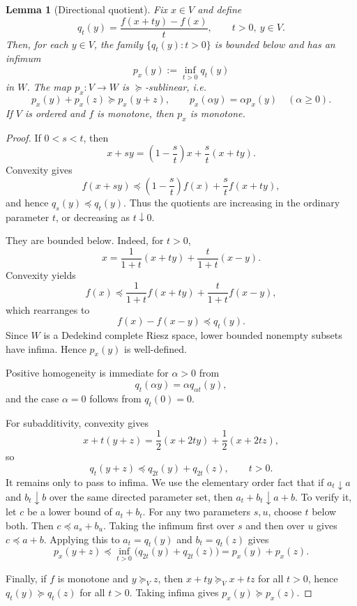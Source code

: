 \documentclass[11pt]{article}
\newtheorem{lemma}{Lemma}
\begin{document}
\begin{lemma}[Directional quotient]\label{lem:directional}
Fix $x\in V$ and define
\[
  q_t(y)=\frac{f(x+ty)-f(x)}{t},\qquad t>0,\ y\in V.
\]
Then, for each $y\in V$, the family $\{q_t(y):t>0\}$ is bounded below and has an
infimum
\[
  p_x(y):=\inf_{t>0}q_t(y)
\]
in $W$. The map $p_x:V\to W$ is $\succeq$-sublinear, i.e.
\[
  p_x(y)+p_x(z)\succeq p_x(y+z),\qquad
  p_x(\alpha y)=\alpha p_x(y)\quad(\alpha\geq0).
\]
If $V$ is ordered and $f$ is monotone, then $p_x$ is monotone.
\end{lemma}

\begin{proof}
If $0<s<t$, then
\[
  x+sy=\left(1-\frac{s}{t}\right)x+\frac{s}{t}(x+ty).
\]
Convexity gives
\[
  f(x+sy)\preceq \left(1-\frac{s}{t}\right)f(x)+\frac{s}{t}f(x+ty),
\]
and hence $q_s(y)\preceq q_t(y)$. Thus the quotients are increasing in the
ordinary parameter $t$, or decreasing as $t\downarrow0$.

They are bounded below. Indeed, for $t>0$,
\[
  x=\frac{1}{1+t}(x+ty)+\frac{t}{1+t}(x-y).
\]
Convexity yields
\[
  f(x)\preceq \frac{1}{1+t}f(x+ty)+\frac{t}{1+t}f(x-y),
\]
which rearranges to
\[
  f(x)-f(x-y)\preceq q_t(y).
\]
Since $W$ is a Dedekind complete Riesz space, lower bounded nonempty subsets
have infima. Hence $p_x(y)$ is well-defined.

Positive homogeneity is immediate for $\alpha>0$ from
\[
  q_t(\alpha y)=\alpha q_{\alpha t}(y),
\]
and the case $\alpha=0$ follows from $q_t(0)=0$.

For subadditivity, convexity gives
\[
  x+t(y+z)=\frac12(x+2ty)+\frac12(x+2tz),
\]
so
\[
  q_t(y+z)\preceq q_{2t}(y)+q_{2t}(z),\qquad t>0.
\]
It remains only to pass to infima. We use the elementary order fact that if
$a_t\downarrow a$ and $b_t\downarrow b$ over the same directed parameter set,
then $a_t+b_t\downarrow a+b$. To verify it, let $c$ be a lower bound of
$a_t+b_t$. For any two parameters $s,u$, choose $t$ below both. Then
$c\preceq a_s+b_u$. Taking the infimum first over $s$ and then over $u$ gives
$c\preceq a+b$. Applying this to $a_t=q_t(y)$ and $b_t=q_t(z)$ gives
\[
  p_x(y+z)
  \preceq \inf_{t>0}\big(q_{2t}(y)+q_{2t}(z)\big)
  =p_x(y)+p_x(z).
\]

Finally, if $f$ is monotone and $y\succeq_V z$, then $x+ty\succeq_V x+tz$ for
all $t>0$, hence $q_t(y)\succeq q_t(z)$ for all $t>0$. Taking infima gives
$p_x(y)\succeq p_x(z)$.
\end{proof}
\end{document}
